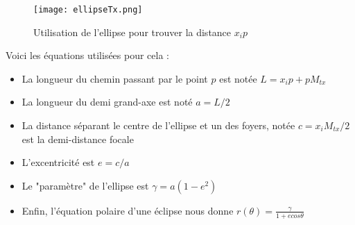 \begin{figure}[h!]
\centering
\texttt{[image: ellipseTx.png]}
\caption{Utilisation de l'ellipse pour trouver la distance $x_i p$}
\end{figure}

Voici les équations utilisées pour cela :
\begin{itemize}
    \item La longueur du chemin passant par le point $p$ est notée $L = x_i p + p M_{tx}$
    \item La longueur du demi grand-axe est noté $a = L/2$
    \item La distance séparant le centre de l'ellipse et un des foyers, notée $c = x_i M_{tx} / 2$ est la demi-distance focale
    \item L'excentricité est $e = c/a$
    \item Le "paramètre" de l'ellipse est $\gamma = a(1-e^2)$
    \item Enfin, l'équation polaire d'une éclipse nous donne $r(\theta) = \frac{\gamma}{1 + e cos\theta}$
\end{itemize} \par

